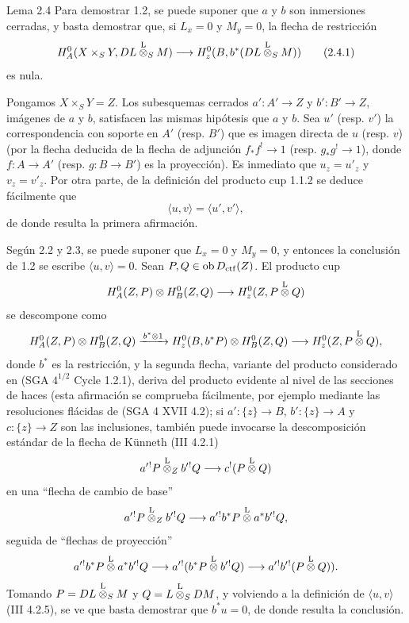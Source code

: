 \begin{statement}{Lema 2.4}
Para demostrar 1.2, se puede suponer que $a$ y $b$ son inmersiones cerradas, y basta demostrar que, si $L_x=0$ y $M_y=0$, la flecha de restricción
\begin{equation}
H_A^0(X\times_SY,DL\overset{\mathrm L}{\otimes}_SM)
 \longrightarrow H_z^0(B,b^*(DL\overset{\mathrm L}{\otimes}_SM))
\tag{2.4.1}
\end{equation}
es nula.
\end{statement}

Pongamos $X\times_SY=Z$. Los subesquemas cerrados $a':A'\to Z$ y $b':B'\to Z$, imágenes de $a$ y $b$, satisfacen las mismas hipótesis que $a$ y $b$. Sea $u'$ (resp. $v'$) la correspondencia con soporte en $A'$ (resp. $B'$) que es imagen directa de $u$ (resp. $v$) (por la flecha deducida de la flecha de adjunción $f_*f^!\to 1$ (resp. $g_*g^!\to 1$), donde $f:A\to A'$ (resp. $g:B\to B'$) es la proyección). Es inmediato que $u_z=u'_z$ y $v_z=v'_z$. Por otra parte, de la definición del producto cup 1.1.2 se deduce fácilmente que
\[
\langle u,v\rangle=\langle u',v'\rangle,
\]
de donde resulta la primera afirmación.

Según 2.2 y 2.3, se puede suponer que $L_x=0$ y $M_y=0$, y entonces la conclusión de 1.2 se escribe $\langle u,v\rangle=0$. Sean $P,Q\in\operatorname{ob} D_{\mathrm{ctf}}(Z)$. El producto cup
\[
H_A^0(Z,P)\otimes H_B^0(Z,Q)\longrightarrow H_z^0(Z,P\overset{\mathrm L}{\otimes} Q)
\]
se descompone como
\[
H_A^0(Z,P)\otimes H_B^0(Z,Q)
 \xrightarrow{\,b^*\otimes 1\,}
H_z^0(B,b^*P)\otimes H_B^0(Z,Q)
 \longrightarrow H_z^0(Z,P\overset{\mathrm L}{\otimes} Q),
\]
donde $b^*$ es la restricción, y la segunda flecha, variante del producto considerado en (SGA $4^{1/2}$ Cycle 1.2.1), deriva del producto evidente al nivel de las secciones de haces (esta afirmación se comprueba fácilmente, por ejemplo mediante las resoluciones flácidas de (SGA 4 XVII 4.2); si $a':\{z\}\to B$, $b':\{z\}\to A$ y $c:\{z\}\to Z$ son las inclusiones, también puede invocarse la descomposición estándar de la flecha de Künneth (III 4.2.1)
\[
a'{}^!P\overset{\mathrm L}{\otimes}_Z b'{}^!Q\longrightarrow c^!(P\overset{\mathrm L}{\otimes} Q)
\]
en una ``flecha de cambio de base''
\[
a'{}^!P\overset{\mathrm L}{\otimes}_Z b'{}^!Q\longrightarrow a'{}^!b^*P\overset{\mathrm L}{\otimes} a^*b'{}^!Q,
\]
seguida de ``flechas de proyección''
\[
a'{}^!b^*P\overset{\mathrm L}{\otimes} a^*b'{}^!Q
 \longrightarrow a'{}^!(b^*P\overset{\mathrm L}{\otimes} b'{}^!Q)
 \longrightarrow a'{}^!b'{}^!(P\overset{\mathrm L}{\otimes} Q)).
\]
Tomando $P=DL\overset{\mathrm L}{\otimes}_SM$ y $Q=L\overset{\mathrm L}{\otimes}_SDM$, y volviendo a la definición de $\langle u,v\rangle$ (III 4.2.5), se ve que basta demostrar que $b^*u=0$, de donde resulta la conclusión.
